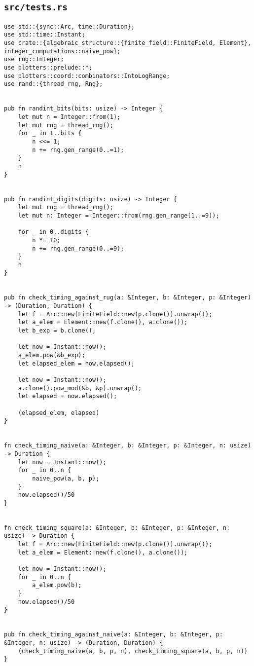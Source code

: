 \subsection{\lstinline{src/tests.rs}}
\label{sec:tests}

\begin{verbatim}
use std::{sync::Arc, time::Duration};
use std::time::Instant;
use crate::{algebraic_structure::{finite_field::FiniteField, Element}, integer_computations::naive_pow};
use rug::Integer;
use plotters::prelude::*;
use plotters::coord::combinators::IntoLogRange;
use rand::{thread_rng, Rng};


pub fn randint_bits(bits: usize) -> Integer {
    let mut n = Integer::from(1);
    let mut rng = thread_rng();
    for _ in 1..bits {
        n <<= 1;
        n += rng.gen_range(0..=1);
    }
    n
}


pub fn randint_digits(digits: usize) -> Integer {
    let mut rng = thread_rng();
    let mut n: Integer = Integer::from(rng.gen_range(1..=9));

    for _ in 0..digits {
        n *= 10;
        n += rng.gen_range(0..=9);
    }
    n
}


pub fn check_timing_against_rug(a: &Integer, b: &Integer, p: &Integer) -> (Duration, Duration) {
    let f = Arc::new(FiniteField::new(p.clone()).unwrap());
    let a_elem = Element::new(f.clone(), a.clone());
    let b_exp = b.clone();

    let now = Instant::now();
    a_elem.pow(&b_exp);
    let elapsed_elem = now.elapsed();

    let now = Instant::now();
    a.clone().pow_mod(&b, &p).unwrap();
    let elapsed = now.elapsed();

    (elapsed_elem, elapsed)
}


fn check_timing_naive(a: &Integer, b: &Integer, p: &Integer, n: usize) -> Duration {
    let now = Instant::now();
    for _ in 0..n {
        naive_pow(a, b, p);
    }
    now.elapsed()/50
}


fn check_timing_square(a: &Integer, b: &Integer, p: &Integer, n: usize) -> Duration {
    let f = Arc::new(FiniteField::new(p.clone()).unwrap());
    let a_elem = Element::new(f.clone(), a.clone());
    
    let now = Instant::now();
    for _ in 0..n {
        a_elem.pow(b);
    }
    now.elapsed()/50
}


pub fn check_timing_against_naive(a: &Integer, b: &Integer, p: &Integer, n: usize) -> (Duration, Duration) {
    (check_timing_naive(a, b, p, n), check_timing_square(a, b, p, n))
}



\end{verbatim}
